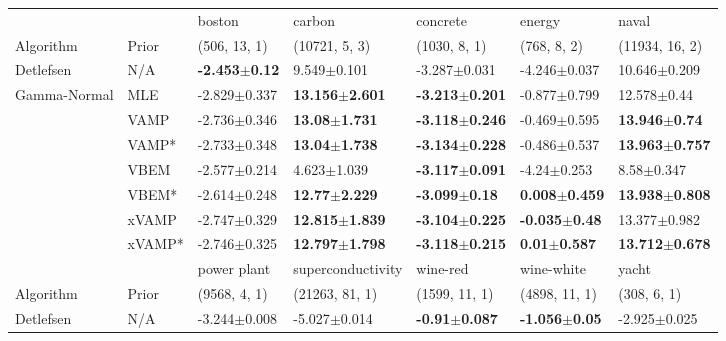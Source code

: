 \begin{tabular}{lllllll}
\toprule
             &        &                    boston &                     carbon &                   concrete &                    energy &                      naval \\
Algorithm & Prior& (506, 13, 1)& (10721, 5, 3)& (1030, 8, 1)& (768, 8, 2)& (11934, 16, 2)\\
\midrule
Detlefsen & N/A &  \textbf{-2.453$\pm$0.12} &            9.549$\pm$0.101 &           -3.287$\pm$0.031 &          -4.246$\pm$0.037 &           10.646$\pm$0.209 \\
Gamma-Normal & MLE &          -2.829$\pm$0.337 &  \textbf{13.156$\pm$2.601} &  \textbf{-3.213$\pm$0.201} &          -0.877$\pm$0.799 &            12.578$\pm$0.44 \\
             & VAMP &          -2.736$\pm$0.346 &   \textbf{13.08$\pm$1.731} &  \textbf{-3.118$\pm$0.246} &          -0.469$\pm$0.595 &   \textbf{13.946$\pm$0.74} \\
             & VAMP* &          -2.733$\pm$0.348 &   \textbf{13.04$\pm$1.738} &  \textbf{-3.134$\pm$0.228} &          -0.486$\pm$0.537 &  \textbf{13.963$\pm$0.757} \\
             & VBEM &          -2.577$\pm$0.214 &            4.623$\pm$1.039 &  \textbf{-3.117$\pm$0.091} &           -4.24$\pm$0.253 &             8.58$\pm$0.347 \\
             & VBEM* &          -2.614$\pm$0.248 &   \textbf{12.77$\pm$2.229} &   \textbf{-3.099$\pm$0.18} &  \textbf{0.008$\pm$0.459} &  \textbf{13.938$\pm$0.808} \\
             & xVAMP &          -2.747$\pm$0.329 &  \textbf{12.815$\pm$1.839} &  \textbf{-3.104$\pm$0.225} &  \textbf{-0.035$\pm$0.48} &           13.377$\pm$0.982 \\
             & xVAMP* &          -2.746$\pm$0.325 &  \textbf{12.797$\pm$1.798} &  \textbf{-3.118$\pm$0.215} &   \textbf{0.01$\pm$0.587} &  \textbf{13.712$\pm$0.678} \\
\midrule
             &        &                power plant &          superconductivity &                  wine-red &                 wine-white &                      yacht \\
Algorithm & Prior& (9568, 4, 1)& (21263, 81, 1)& (1599, 11, 1)& (4898, 11, 1)& (308, 6, 1)\\
\midrule
Detlefsen & N/A &           -3.244$\pm$0.008 &           -5.027$\pm$0.014 &  \textbf{-0.91$\pm$0.087} &   \textbf{-1.056$\pm$0.05} &           -2.925$\pm$0.025 \\

\end{tabular}
